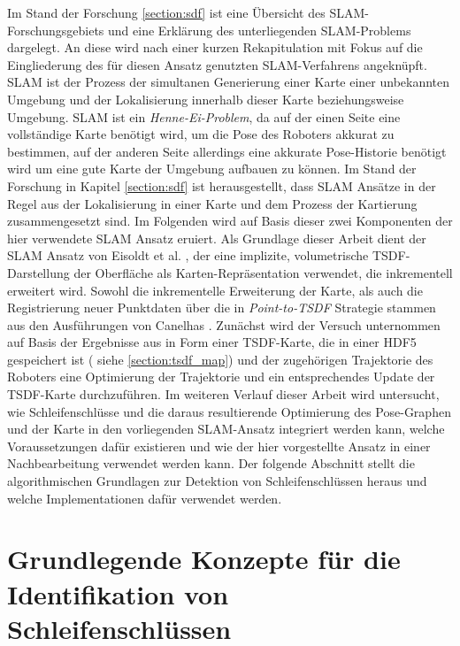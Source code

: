 Im Stand der Forschung \ref{section:sdf} ist eine Übersicht des SLAM-Forschungsgebiets und eine Erklärung des unterliegenden SLAM-Problems dargelegt. An diese wird nach einer kurzen Rekapitulation mit Fokus auf die Eingliederung des für diesen Ansatz genutzten SLAM-Verfahrens angeknüpft. SLAM ist der Prozess der simultanen Generierung einer Karte einer unbekannten Umgebung und der Lokalisierung innerhalb dieser Karte beziehungsweise Umgebung. SLAM ist ein \emph{Henne-Ei-Problem}, da auf der einen Seite eine vollständige Karte benötigt wird, um die Pose des Roboters akkurat zu bestimmen, auf der anderen Seite allerdings eine akkurate Pose-Historie benötigt wird um eine gute Karte der Umgebung aufbauen zu können. Im Stand der Forschung in Kapitel \ref{section:sdf} ist herausgestellt, dass SLAM Ansätze in der Regel aus der Lokalisierung in einer Karte und dem Prozess der Kartierung zusammengesetzt sind. Im Folgenden wird auf Basis dieser zwei Komponenten der hier verwendete SLAM Ansatz eruiert. Als Grundlage dieser Arbeit dient der SLAM Ansatz von Eisoldt et al. \cite{HATSDF}, der eine implizite, volumetrische TSDF-Darstellung der Oberfläche als Karten-Repräsentation verwendet, die inkrementell erweitert wird. Sowohl die inkrementelle Erweiterung der Karte, als auch die Registrierung neuer Punktdaten über die in \emph{Point-to-TSDF} Strategie stammen aus den Ausführungen von Canelhas \cite{Canelhas2017TruncatedSD}. Zunächst wird der Versuch unternommen auf Basis der Ergebnisse aus \cite{HATSDF} in Form einer TSDF-Karte, die in einer HDF5 gespeichert ist ( siehe \ref{section:tsdf_map}) und der zugehörigen Trajektorie des Roboters eine Optimierung der Trajektorie und ein entsprechendes Update der TSDF-Karte durchzuführen. Im weiteren Verlauf dieser Arbeit wird untersucht, wie Schleifenschlüsse und die daraus resultierende Optimierung des Pose-Graphen und der Karte in den vorliegenden SLAM-Ansatz integriert werden kann, welche Voraussetzungen dafür existieren und wie der hier vorgestellte Ansatz in einer Nachbearbeitung verwendet werden kann. Der folgende Abschnitt stellt die algorithmischen Grundlagen zur Detektion von Schleifenschlüssen heraus und welche Implementationen dafür verwendet werden.

\section{Grundlegende Konzepte für die Identifikation von Schleifenschlüssen}

